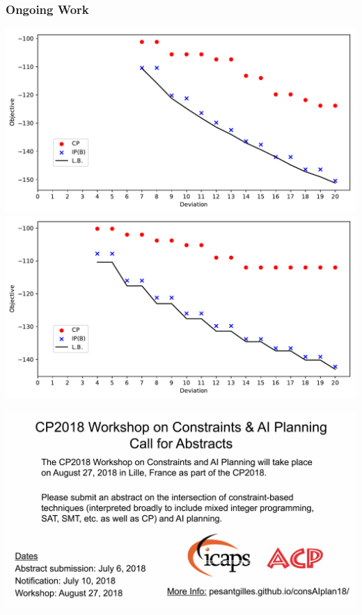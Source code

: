 \documentclass{beamer}
\begin{document}
\begin{frame}
  \frametitle{Ongoing Work}
  
  \begin{center}
    \includegraphics[scale=0.35]{future_noconflict-norm1-tl600.pdf}
    \includegraphics[scale=0.35]{future_noconflict-norm2-tl600.pdf}
  \end{center}
  
\end{frame}




\begin{frame}
  
  \begin{center}
    \includegraphics[scale=0.4]{publicity.pdf}
  \end{center}
  
\end{frame}


\end{document}
